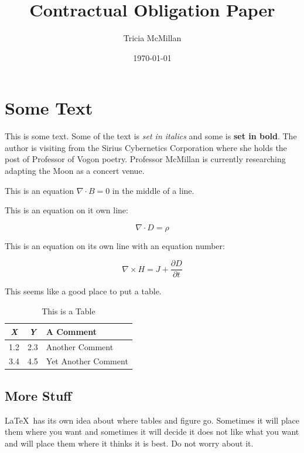\documentclass[12pt,letterpaper]{article}
\title{Contractual Obligation Paper}
\author{Tricia McMillan}
\date{\today}
\begin{document}
\maketitle

\section{Some Text}

This is some text. Some of the text is \textit{set in italics} and some
is \textbf{set in bold}. The author is visiting from the Sirius
Cybernetics Corporation where she holds the post of Professor of Vogon
poetry\cite{adams1979hitchhiker}. Professor McMillan is currently
researching adapting the Moon as a concert
venue\cite{2011JGRE..11600H03S}.

This is an equation $\nabla \cdot B = 0$ in the middle of a line.

This is an equation on it own line: 

\[
 \nabla \cdot D = \rho
\]

This is an equation on its own line with an equation number:

\begin{equation}
    \nabla \times H = J + \frac{\partial D}{\partial t}
\end{equation}

This seems like a good place to put a table. 

\begin{table}[h]
\centering
\begin{tabular}{ccl}
{\it X} & {\it Y} & A Comment \\ \hline
1.2 & 2.3 & Another Comment\\
3.4 & 4.5 & Yet Another Comment\\ \hline
\end{tabular}
\caption{This is a Table}
\label{ATable}
\end{table}

\subsection{More Stuff}

\LaTeX\ has its own idea about where tables and figure go. Sometimes
it will place them where you want and sometimes it will decide it does
not like what you want and will place them where it thinks it is best.
Do not worry about it.
\end{document}
